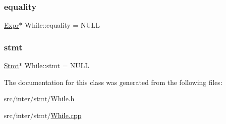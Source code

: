 \subsubsection{\texorpdfstring{equality}{equality}}
{\footnotesize\ttfamily \hyperlink{class_expr}{Expr}$\ast$ While\+::equality = N\+U\+LL}

\mbox{\label{class_while_a97dfbf50f27b969c5b765ecfb1ef4ac2}} 
\subsubsection{\texorpdfstring{stmt}{stmt}}
{\footnotesize\ttfamily \hyperlink{class_stmt}{Stmt}$\ast$ While\+::stmt = N\+U\+LL}



The documentation for this class was generated from the following files\+:\begin{DoxyCompactItemize}
\item 
src/inter/stmt/\hyperlink{_while_8h}{While.\+h}\item 
src/inter/stmt/\hyperlink{_while_8cpp}{While.\+cpp}\end{DoxyCompactItemize}
